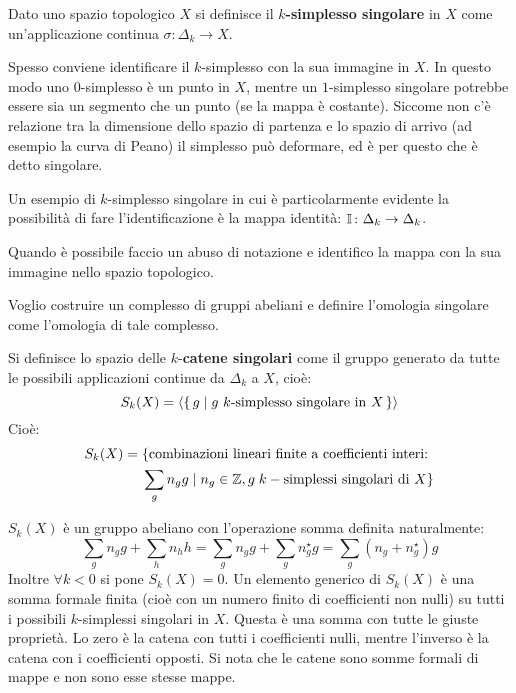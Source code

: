 \begin{definition}
  Dato uno spazio topologico $ X $ si definisce il \textbf{$ k $-simplesso singolare}
  in $ X $ come un'applicazione continua $ \sigma: \Delta_k \to X $.
\end{definition}
Spesso conviene identificare il $ k $-simplesso con la sua immagine in $ X $.
In questo modo uno $ 0 $-simplesso è un punto in $ X $, mentre un $ 1 $-simplesso singolare potrebbe
essere sia un segmento che un punto (se la mappa è costante).
Siccome non c'è relazione tra la dimensione dello spazio di partenza e lo spazio di arrivo
(ad esempio la curva di Peano) il simplesso può deformare, ed è per questo che è detto singolare.

\begin{example}
  Un esempio di $ k $-simplesso singolare in cui è particolarmente evidente la possibilità di fare l'identificazione
  è la mappa identità: $ \mathbb{I}_{} \colon \Delta_k \to \Delta_k $.
\end{example}
\begin{osservation}
  Quando è possibile faccio un abuso di notazione e identifico la mappa con la sua immagine
  nello spazio topologico.
\end{osservation}

Voglio costruire un complesso di gruppi abeliani e definire l'omologia singolare
come l'omologia di tale complesso.

\begin{definition}
  Si definisce lo spazio delle $ k $-\textbf{catene
    singolari} come il gruppo generato da tutte le
  possibili applicazioni continue da $ \Delta_k $ a $ X $, cioè:
  \[
    S_k(X) = \langle \set{g | g \text{ $ k $-simplesso singolare in $ X $}} \rangle
  \]
  Cioè:
  \begin{align*}
  S_k(X) ={}& \{\text{combinazioni lineari finite a coefficienti interi: } \\
            & \sum_g n_g g \;|\; n_g \in \mathbb{Z}, g \; k-\text{simplessi singolari di } X \}
  \end{align*}
\end{definition}
$ S_k(X) $ è un gruppo abeliano con l'operazione somma definita naturalmente:
\[
  \sum_g n_g g + \sum_h n_h h =   \sum_g n_g g + \sum_g n_g^\star g = \sum_g (n_g + n_g^\star)g
\]
Inoltre $ \forall k < 0 $ si pone $ S_k(X) = 0 $. Un elemento generico di $ S_k(X) $
è una somma formale finita (cioè con un numero finito di coefficienti non nulli)
su tutti i possibili $ k $-simplessi singolari in $ X $.
Questa è una somma con tutte le giuste proprietà. Lo zero è la catena con tutti
i coefficienti nulli, mentre l'inverso è la catena con i coefficienti opposti.
Si nota che le catene sono somme formali di mappe e non sono esse stesse mappe.

